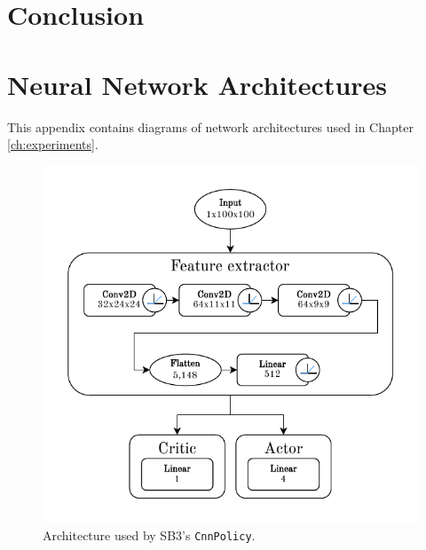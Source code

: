 \documentclass[
  digital,     %
  oneside,     %
  nosansbold,  %
  nocolorbold, %
  lof,         %
  lot,         %
]{fithesis4}
\begin{document}
\chapter*{Conclusion}


\printbibliography[heading=bibintoc] %


\appendix %
\chapter{Neural Network Architectures}
This appendix contains diagrams of network architectures used in Chapter \ref{ch:experiments}.

\begin{figure}
    \includegraphics[width=1\linewidth]{diagrams/cnn_arch.pdf}
    \caption{Architecture used by SB3's \texttt{CnnPolicy}.}
    \label{fig:cnn_policy}
\end{figure}
\end{document}
